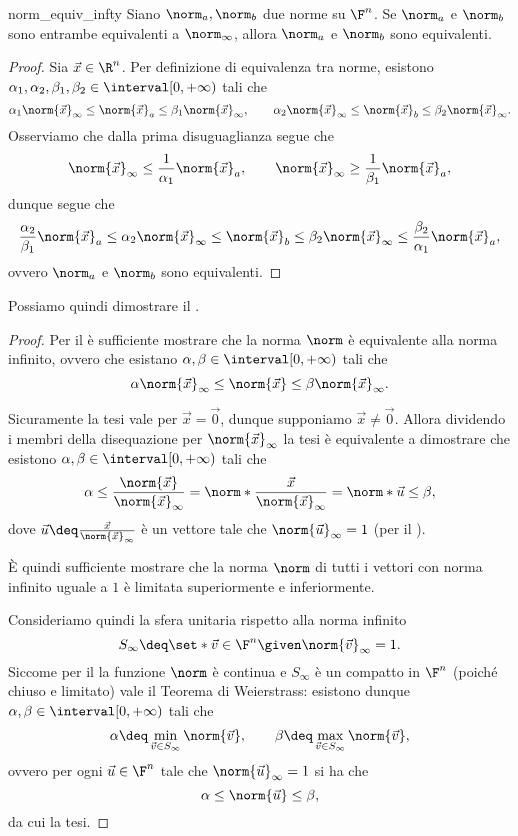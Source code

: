 \begin{lemma}{}{norm_equiv_infty}
    Siano $\norm_{a}, \norm_b$ due norme su $\F^n$. Se $\norm_{a}$ e $\norm_{b}$ sono entrambe equivalenti a $\norm_{\infty}$, allora $\norm_a$ e $\norm_b$ sono equivalenti.  
\end{lemma}
\begin{proof}
    Sia $\vec x \in \R^n$. Per definizione di equivalenza tra norme, esistono $\alpha_1, \alpha_2, \beta_1, \beta_2 \in \interval[{0, +\infty})$ tali che \[
        \alpha_1\norm{\vec x}_{\infty} \leq \norm{\vec x}_a \leq \beta_1\norm{\vec x}_\infty,
        \qquad
        \alpha_2\norm{\vec x}_{\infty} \leq \norm{\vec x}_b \leq \beta_2\norm{\vec x}_\infty.
    \] Osserviamo che dalla prima disuguaglianza segue che \[
        \norm{\vec x}_{\infty} \leq \frac{1}{\alpha_1} \norm{\vec x}_a, 
        \qquad
        \norm{\vec x}_{\infty} \geq \frac{1}{\beta_1} \norm{\vec x}_a,
    \] dunque segue che \[
        \frac{\alpha_2}{\beta_1} \norm{\vec x}_a \leq \alpha_2\norm{\vec x}_{\infty} \leq \norm{\vec x}_b \leq \beta_2\norm{\vec x}_\infty \leq \frac{\beta_2}{\alpha_1} \norm{\vec x}_a,
    \] ovvero $\norm_a$ e $\norm_b$ sono equivalenti.  
\end{proof}

Possiamo quindi dimostrare il .
\begin{proof}
    Per il  è sufficiente mostrare che la norma $\norm$ è equivalente alla norma infinito, ovvero che esistano $\alpha, \beta \in \interval[{0, +\infty})$ tali che \[
        \alpha\norm{\vec x}_{\infty} \leq \norm{\vec x} \leq \beta \norm{\vec x}_{\infty}.
    \] 
    
    Sicuramente la tesi vale per $\vec x = \vec 0$, dunque supponiamo $\vec x \neq \vec 0$. Allora dividendo i membri della disequazione per $\norm{\vec x}_{\infty}$ la tesi è equivalente a dimostrare che esistono $\alpha, \beta \in \interval[{0, +\infty})$ tali che \[
        \alpha \leq \frac{\norm{\vec x}}{\norm{\vec x}_{\infty}} = \norm*{\frac{\vec x}{\norm{\vec x}_{\infty}}} = \norm*{\vec u} \leq \beta,
    \] dove $\vec u \deq \frac{\vec x}{\norm{\vec x}_{\infty}}$ è un vettore tale che $\norm{\vec u}_{\infty} = 1$ (per il ).

    È quindi sufficiente mostrare che la norma $\norm$ di tutti i vettori con norma infinito uguale a $1$ è limitata superiormente e inferiormente.
    
    Consideriamo quindi la sfera unitaria rispetto alla norma infinito \[
        S_\infty \deq \set*{\vec v \in \F^n \given \norm{\vec v}_{\infty} = 1}.
    \] Siccome per il  la funzione $\norm$ è continua e $S_{\infty}$ è un compatto in $\F^n$ (poiché chiuso e limitato) vale il Teorema di Weierstrass: esistono dunque $\alpha, \beta \in \interval[{0, +\infty})$ tali che \[
        \alpha \deq \min_{\vec v \in S_\infty} \norm{\vec v}, \qquad \beta \deq \max_{\vec v \in S_\infty} \norm{\vec v},
    \] ovvero per ogni $\vec u \in \F^n$ tale che $\norm{\vec u}_{\infty} = 1$ si ha che \[
        \alpha \leq \norm{\vec u} \leq \beta,
    \] da cui la tesi.
\end{proof}